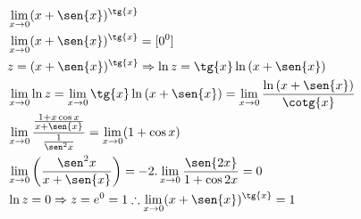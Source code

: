 \begin{ex}
\begin{align}
&\lim_{x\rightarrow 0} (x+\sen{x})^{\tg{x}}\nonumber\\
&\lim_{x\rightarrow 0} (x+\sen{x})^{\tg{x}}=[0^0]\nonumber\\
&z=(x+\sen{x})^{\tg{x}} \Rightarrow \ln{z}=\tg{x}\ln{(x+\sen{x})}\nonumber\\
&\lim_{x\rightarrow 0} \ln{z}=\lim_{x\rightarrow 0} \tg{x}\ln{(x+\sen{x})}=\lim_{x\rightarrow 0} \frac{\ln{(x+\sen{x})}}{\cotg{x}}\nonumber\\
&\lim_{x\rightarrow 0} \frac{\frac{1+x\cos{x}}{x+\sen{x}}}{\frac{1}{\sen^2{x}}}=\lim_{x\rightarrow 0} (1+\cos{x})\nonumber\\
&\lim_{x\rightarrow 0} \left(\frac{\sen^2{x}}{x+\sen{x}}\right)=-2.\lim_{x\rightarrow 0} \frac{\sen{2x}}{1+\cos{2x}}=0\nonumber\\
&\ln{z}=0 \Rightarrow z=e^0=1 \therefore \lim_{x\rightarrow 0} (x+\sen{x})^{\tg{x}}=1\nonumber
\end{align}
\end{ex}
